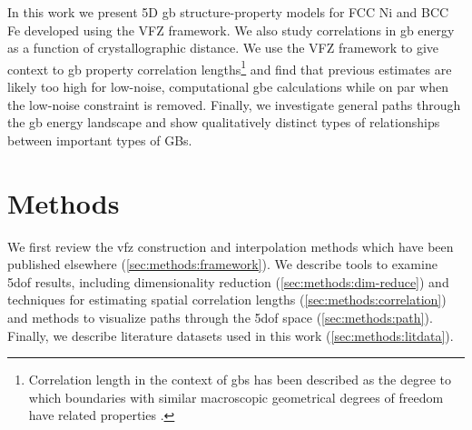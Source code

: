 \documentclass[final,twocolumn,12pt]{elsarticle}
\begin{document}
	In this work we present 5D \gls{gb} structure-property models for FCC Ni and BCC Fe developed using the VFZ framework. We also study correlations in \gls{gb} energy as a function of crystallographic distance. We use the VFZ framework to give context to \gls{gb} property correlation lengths\footnote{Correlation length in the context of \glspl{gb} has been described as the degree to which boundaries with similar
    macroscopic geometrical degrees of freedom have related properties \cite{olmstedSurveyComputedGrain2009}. } and find that previous estimates are likely too high for low-noise, computational \gls{gbe} calculations while on par when the low-noise constraint is removed. Finally, we investigate general paths through the \gls{gb} energy landscape and show qualitatively distinct types of relationships between important types of GBs.
	
	
	
	

	
	\section{Methods} \label{sec:methods}
	We first review the \gls{vfz} construction and interpolation methods which have been published elsewhere \cite{bairdFiveDegreeofFreedomPropertyUnderReview} (\cref{sec:methods:framework}). We describe tools to examine \gls{5dof} results, including dimensionality reduction (\cref{sec:methods:dim-reduce}) and techniques for estimating spatial correlation lengths (\cref{sec:methods:correlation}) and methods to visualize paths through the \gls{5dof} space (\cref{sec:methods:path}). Finally, we describe literature datasets used in this work (\cref{sec:methods:litdata}).
	
\end{document}
